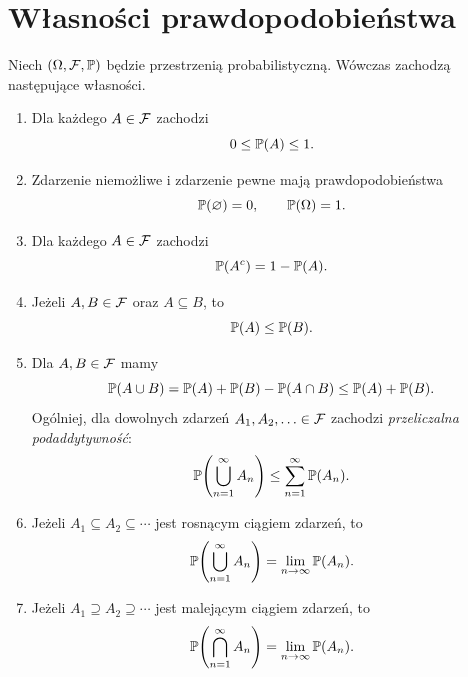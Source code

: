 \section{Własności prawdopodobieństwa}
\label{sec:wlasnosci}

\begin{twierdzenie}
\label{tw:wlasnosci}
Niech $(\Omega,\mathcal{F},\mathbb{P})$ będzie przestrzenią probabilistyczną.
Wówczas zachodzą następujące własności.
\begin{enumerate}[label=\arabic*),ref=\arabic*]
  \item\label{wlasn:zakres}
    Dla każdego $A\in\mathcal{F}$ zachodzi
    \[
      0\leq\mathbb{P}(A)\leq1.
    \]
  \item\label{wlasn:pewne}
    Zdarzenie niemożliwe i zdarzenie pewne mają prawdopodobieństwa
    \[
      \mathbb{P}(\varnothing)=0,\qquad \mathbb{P}(\Omega)=1.
    \]
  \item\label{wlasn:dopelnienie}
    Dla każdego $A\in\mathcal{F}$ zachodzi
    \[
      \mathbb{P}(A^c)=1-\mathbb{P}(A).
    \]
  \item\label{wlasn:monotonicznosc}
    Jeżeli $A,B\in\mathcal{F}$ oraz $A\subseteq B$, to
    \[
      \mathbb{P}(A)\leq\mathbb{P}(B).
    \]
  \item\label{wlasn:suma}
    Dla $A,B\in\mathcal{F}$ mamy
    \[
      \mathbb{P}(A\cup B)=\mathbb{P}(A)+\mathbb{P}(B)-\mathbb{P}(A\cap B)
        \leq\mathbb{P}(A)+\mathbb{P}(B).
    \]
    Ogólniej, dla dowolnych zdarzeń $A_1,A_2,\ldots\in\mathcal{F}$
    zachodzi \emph{przeliczalna podaddytywność}:
    \[
      \mathbb{P}\!\left(\bigcup_{n=1}^{\infty}A_n\right)
        \leq\sum_{n=1}^{\infty}\mathbb{P}(A_n).
    \]
  \item\label{wlasn:rosnacy}
    Jeżeli $A_1\subseteq A_2\subseteq\cdots$ jest rosnącym
    ciągiem zdarzeń, to
    \begin{equation}
      \mathbb{P}\!\left(\bigcup_{n=1}^{\infty}A_n\right)
        =\lim_{n\to\infty}\mathbb{P}(A_n).
      \label{eq:ciag-rosnacy}
    \end{equation}
  \item\label{wlasn:malejacy}
    Jeżeli $A_1\supseteq A_2\supseteq\cdots$ jest malejącym
    ciągiem zdarzeń, to
    \begin{equation}
      \mathbb{P}\!\left(\bigcap_{n=1}^{\infty}A_n\right)
        =\lim_{n\to\infty}\mathbb{P}(A_n).
      \label{eq:ciag-malejacy}
    \end{equation}
\end{enumerate}
\end{twierdzenie}

